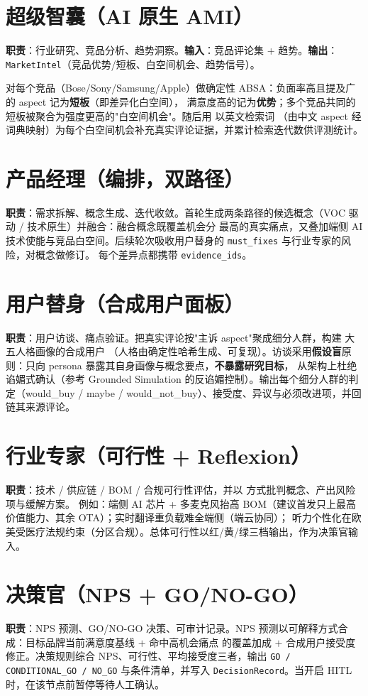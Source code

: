 \section{超级智囊（AI 原生 AMI）}
\textbf{职责}：行业研究、竞品分析、趋势洞察。\textbf{输入}：竞品评论集 + 趋势。\textbf{输出}：\texttt{MarketIntel}（竞品优势/短板、白空间机会、趋势信号）。

对每个竞品（Bose/Sony/Samsung/Apple）做确定性 ABSA：负面率高且提及广的 aspect 记为\textbf{短板}（即差异化白空间），
满意度高的记为\textbf{优势}；多个竞品共同的短板被聚合为强度更高的"白空间机会"。随后用  以英文检索词
（由中文 aspect 经词典映射）为每个白空间机会补充真实评论证据，并累计检索迭代数供评测统计。

\section{产品经理（编排，双路径）}
\textbf{职责}：需求拆解、概念生成、迭代收敛。首轮生成两条路径的候选概念（VOC 驱动 / 技术原生）并融合：融合概念既覆盖机会分
最高的真实痛点，又叠加端侧 AI 技术使能与竞品白空间。后续轮次吸收用户替身的 \texttt{must\_fixes} 与行业专家的风险，对概念做修订。
每个差异点都携带 \texttt{evidence\_ids}。

\section{用户替身（合成用户面板）}
\textbf{职责}：用户访谈、痛点验证。把真实评论按"主诉 aspect"聚成细分人群，构建  大五人格画像的合成用户
（人格由确定性哈希生成、可复现）。访谈采用\textbf{假设盲}原则：只向 persona 暴露其自身画像与概念要点，\textbf{不暴露研究目标}，
从架构上杜绝谄媚式确认（参考 Grounded Simulation 的反谄媚控制）。输出每个细分人群的判定（would\_buy / maybe /
would\_not\_buy）、接受度、异议与必须改进项，并回链其来源评论。

\section{行业专家（可行性 + Reflexion）}
\textbf{职责}：技术 / 供应链 / BOM / 合规可行性评估，并以  方式批判概念、产出风险项与缓解方案。
例如：端侧 AI 芯片 + 多麦克风抬高 BOM（建议首发只上最高价值能力、其余 OTA）；实时翻译重负载难全端侧（端云协同）；
听力个性化在欧美受医疗法规约束（分区合规）。总体可行性以红/黄/绿三档输出，作为决策官输入。

\section{决策官（NPS + GO/NO-GO）}
\textbf{职责}：NPS 预测、GO/NO-GO 决策、可审计记录。NPS 预测以可解释方式合成：目标品牌当前满意度基线 $+$ 命中高机会痛点
的覆盖加成 $+$ 合成用户接受度修正。决策规则综合 NPS、可行性、平均接受度三者，输出 \texttt{GO / CONDITIONAL\_GO /
NO\_GO} 与条件清单，并写入 \texttt{DecisionRecord}。当开启 HITL 时，在该节点前暂停等待人工确认。

